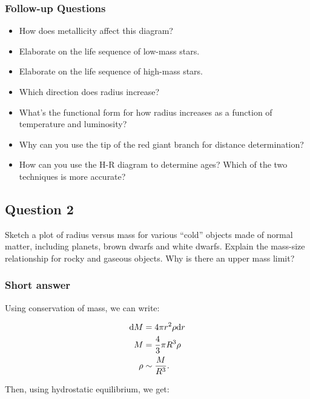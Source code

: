 \documentclass[a4paper,10pt]{article}
\begin{document}
\newpage
\subsubsection{Follow-up Questions}

\begin{itemize}
    \item How does metallicity affect this diagram?
    \item Elaborate on the life sequence of low-mass stars.
    \item Elaborate on the life sequence of high-mass stars.
    \item Which direction does radius increase?
    \item What's the functional form for how radius increases as a function of temperature and luminosity?
    \item Why can you use the tip of the red giant branch for distance determination?
    \item How can you use the H-R diagram to determine ages? Which of the two techniques is more accurate?
\end{itemize}


\newpage
\subsection{Question 2}

Sketch a plot of radius versus mass for various ``cold'' objects made of normal matter, including planets, brown dwarfs and white dwarfs. Explain the mass-size relationship for rocky and
gaseous objects. Why is there an upper mass limit?

\subsubsection{Short answer}

Using conservation of mass, we can write:

\begin{align*}
    {\rm d}M &= 4\pi r^2\rho{\rm d}r \\
           M &= \frac{4}{3}\pi R^3\rho \\
        \rho &\sim \frac{M}{R^3}.
\end{align*}

{\noindent}Then, using hydrostatic equilibrium, we get:
\end{document}
